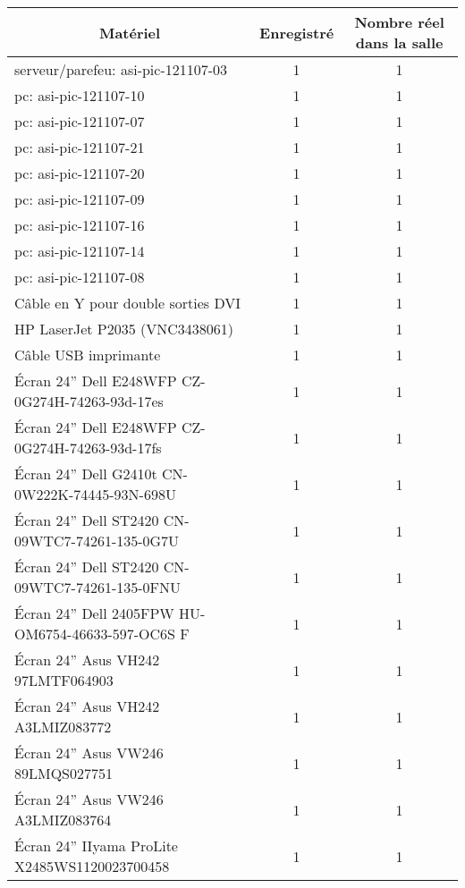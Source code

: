 
\begin{center}
\begin{longtable}{|p{10cm}|c|c|}
\hline \multicolumn{1}{|c|}{\textbf{Matériel}} & \multicolumn{1}{c|}{\textbf{Enregistré}} & \multicolumn{1}{c|}{\textbf{Nombre réel dans la salle}} \\ \hline 
\endfirsthead

		\hline serveur/parefeu: asi-pic-121107-03  & 1 & 1 \\
		\hline pc: asi-pic-121107-10 & 1 & 1 \\
		\hline pc: asi-pic-121107-07 & 1 & 1 \\
		\hline pc: asi-pic-121107-21 & 1 & 1 \\
		\hline pc: asi-pic-121107-20 & 1 & 1 \\
		\hline pc: asi-pic-121107-09 & 1 & 1 \\
		\hline pc: asi-pic-121107-16 & 1 & 1 \\
		\hline pc: asi-pic-121107-14 & 1 & 1 \\
		\hline pc: asi-pic-121107-08 & 1 & 1 \\
		\hline Câble en Y pour double sorties DVI & 1 & 1 \\ 
		\hline HP LaserJet P2035 (VNC3438061)& 1 & 1 \\ 
		\hline Câble USB imprimante & 1 & 1 \\ 
		\hline Écran 24” Dell E248WFP CZ-0G274H-74263-93d-17es & 1 & 1 \\ 
		\hline Écran 24” Dell E248WFP CZ-0G274H-74263-93d-17fs & 1 & 1 \\ 
		\hline Écran 24” Dell G2410t CN-0W222K-74445-93N-698U & 1 & 1 \\ 
		\hline Écran 24” Dell ST2420 CN-09WTC7-74261-135-0G7U & 1 & 1 \\ 
		\hline Écran 24” Dell ST2420 CN-09WTC7-74261-135-0FNU & 1 & 1 \\ 
		\hline Écran 24” Dell 2405FPW HU-OM6754-46633-597-OC6S F  & 1 & 1 \\ 
		\hline Écran 24” Asus VH242 97LMTF064903 & 1 & 1 \\ 
		\hline Écran 24” Asus VH242 A3LMIZ083772 & 1 & 1 \\ 
		\hline Écran 24” Asus VW246 89LMQS027751 & 1 & 1 \\
		\hline Écran 24” Asus VW246 A3LMIZ083764 & 1 & 1 \\	
		\hline Écran 24” IIyama ProLite X2485WS1120023700458 & 1 & 1 \\ 

\end{longtable}
\end{center}
